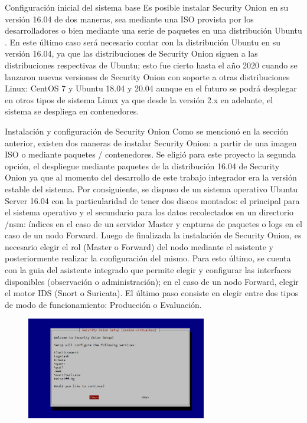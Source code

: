     \begin{section}{Configuración inicial del sistema base}
        Es posible instalar Security Onion en su versión 16.04 de dos maneras, sea mediante una ISO provista por los desarrolladores o bien mediante una serie de paquetes en una distribución Ubuntu \cite{ubuntu}. En este último caso será necesario contar con la distribución Ubuntu en su versión 16.04, ya que las distribuciones de Security Onion siguen a las distribuciones respectivas de Ubuntu; esto fue cierto hasta el año 2020 cuando se lanzaron nuevas versiones de Security Onion con soporte a otras distribuciones Linux: CentOS 7 y Ubuntu 18.04 y 20.04 aunque en el futuro se podrá desplegar en otros tipos de sistema Linux ya que desde la versión 2.x en adelante, el sistema se despliega en contenedores.

        \begin{subsection}{Instalación y configuración de Security Onion}
        Como se mencionó en la sección anterior, existen dos maneras de instalar Security Onion: a partir de una imagen ISO o mediante paquetes / contenedores. Se eligió para este proyecto la segunda opción, el despliegue mediante paquetes de la distribución 16.04 de Security Onion ya que al momento del desarrollo de este trabajo integrador era la versión estable del sistema. Por consiguiente, se dispuso de un sistema operativo Ubuntu Server 16.04 con la particularidad de tener dos discos montados: el principal para el sistema operativo y el secundario para los datos recolectados en un directorio /nsm: índices en el caso de un servidor Master y capturas de paquetes o logs en el caso de un nodo Forward. Luego de finalizada la instalación de Security Onion, es necesario elegir el rol (Master o Forward) del nodo mediante el asistente y posteriormente realizar la configuración del mismo. Para esto último, se cuenta con la guia del asistente integrado que permite elegir y configurar las interfaces disponibles (observación o administración); en el caso de un nodo Forward, elegir el motor IDS (Snort o Suricata). El último paso consiste en elegir entre dos tipos de modo de funcionamiento: Producción o Evaluación.
         \begin{figure}[H]
            \centering
            \includegraphics[width=0.7\textwidth]{./iteracion_2_imagenes/figura_37_sonion_conf.png}

\end{figure}
\end{subsection}
\end{section}
